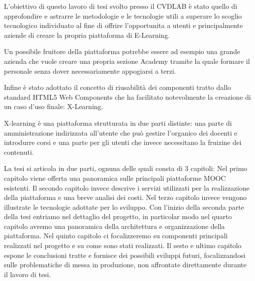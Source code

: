 L'obiettivo di questo lavoro di tesi svolto presso il CVDLAB è stato quello di approfondire e astrarre le metodologie e le tecnologie utili a superare lo scoglio tecnologico individuato al fine di offrire l'opportunita a utenti e principalmente aziende di creare la propria piattaforma di E-Learning.

Un possibile fruitore della piattaforma potrebbe essere ad esempio una grande azienda che vuole creare una propria sezione Academy tramite la quale formare il personale senza dover necessariamente appogiarsi a terzi. 

Infine è stato adottato il concetto di riusabilità dei componenti tratto dallo standard HTML5 Web Components che ha facilitato notevolmente la creazione di un caso d'uso finale: X-Learning.

X-learning è una piattaforma strutturata in due parti distinte: una parte di amministrazione indirizzata all'utente che può gestire l'organico dei docenti e introdurre corsi e una parte per gli utenti che invece necessitano la fruizine dei contenuti.

La tesi si articola in due parti, ognuna delle quali consta di 3 capitoli:
Nel primo capitolo viene offerta una panoramica sulle principali piattaforme MOOC esistenti.
Il secondo capitolo invece descrive i servizi utilizzati per la realizzazione della piattaforma e una breve analisi dei costi.
Nel terzo capitolo invece vengono illustrate le tecnologie adottate per lo sviluppo.
Con l'inizio della seconda parte della tesi entriamo nel dettaglio del progetto, in particolar modo nel quarto capitolo avremo una panoramica della architettura e organizzazione della piattaforma.
Nel quinto capitolo ci focalizzeremo su componenti principali realizzati nel progetto e su come sono stati realizzati.
Il sesto e ultimo capitolo espone le conclusioni tratte e fornisce dei possibili sviluppi futuri, focalizzandosi sulle problematiche di messa in produzione, non affrontate direttamente durante il lavoro di tesi.